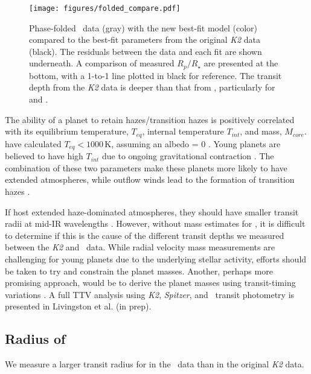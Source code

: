 \documentclass[twocolumn]{aastex631}
\begin{document}
\begin{figure}[!ht]
\begin{center}
\texttt{[image: figures/folded\_compare.pdf]}
\caption{Phase-folded \tess\ data (gray) with the new best-fit model (color) compared to the best-fit parameters from the original \textit{K2} data (black). The residuals between the data and each fit are shown underneath. A comparison of measured $R_p/R_\star$ are presented at the bottom, with a 1-to-1 line plotted in black for reference. The transit depth from the \textit{K2} data is deeper than that from \tess, particularly for \planetb and \planete.} \label{fig:compare}
\end{center}
\end{figure}

The ability of a planet to retain hazes/transition hazes is positively correlated with its equilibrium temperature, $T_{eq}$, internal temperature $T_{int}$, and mass, $M_{core}$. \planetknown have calculated $T_{eq}<1000$\,K, assuming an albedo = 0 \citep{David2019a}. Young planets are believed to have high $T_{int}$ due to ongoing gravitational contraction \citep{gu04}. The combination of these two parameters make these planets more likely to have extended atmospheres, while outflow winds lead to the formation of transition hazes \citep{gao20}. 

If \planetknown host extended haze-dominated atmospheres, they should have smaller transit radii at mid-IR wavelengths \citep{gao20}. However, without mass estimates for \planetknown, it is difficult to determine if this is the cause of the different transit depths we measured between the \textit{K2} and \tess\ data. While radial velocity mass measurements are challenging for young planets due to the underlying stellar activity, efforts should be taken to try and constrain the planet masses. Another, perhaps more promising approach, would be to derive the planet masses using transit-timing variations \citep[TTVs;][]{agol18}. A full TTV analysis using \textit{K2}, \textit{Spitzer}, and \tess\ transit photometry is presented in Livingston et al. (in prep). 

\subsection{Radius of \planete}

We measure a larger transit radius for \planete in the \tess\ data than in the original \textit{K2} data.
\end{document}
